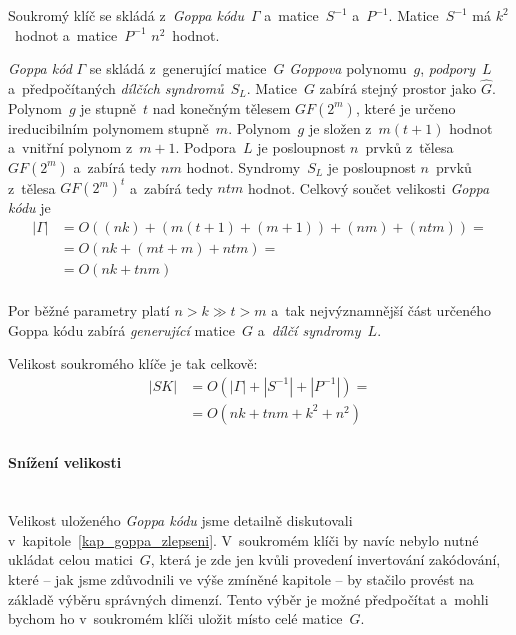 \documentclass[thesis=M,czech,hidelinks]{FITthesis}[2012/06/26]
\newcommand{\0}{{\textcolor[gray]{0.75}{0}}}
\begin{document}
Soukromý klíč se skládá z~\emph{Goppa kódu}~$\Gamma$ a~matice~$S^{-1}$
a~$P^{-1}$. Matice~$S^{-1}$ má $k^2$~hodnot a~matice~$P^{-1}$ $n^2$~hodnot.

\emph{Goppa kód} $\Gamma$ se skládá z~generující matice~$G$ \emph{Goppova}
polynomu~$g$, \emph{podpory}~$L$ a~předpočítaných \emph{dílčích syndromů}~$S_L$.
Matice~$G$ zabírá stejný prostor jako $\hat{G}$. Polynom~$g$ je stupně~$t$ nad
konečným tělesem $GF(2^m)$, které je určeno ireducibilním polynomem stupně~$m$.
Polynom~$g$ je složen z~$m(t+1)$ hodnot a~vnitřní polynom z~$m+1$. Podpora~$L$
je posloupnost $n$~prvků z~tělesa $GF(2^m)$ a~zabírá tedy $n m$ hodnot.
Syndromy~$S_L$ je posloupnost $n$~prvků z~tělesa $GF(2^m)^t$ a~zabírá tedy
$n t m$ hodnot. Celkový součet velikosti \emph{Goppa kódu} je
\begin{align*}
    \left|\Gamma\right| &= O\left( (nk) + ( m(t+1) + (m+1) ) + (nm) + (ntm) \right) = \\
                        &= O\left(  nk + ( mt + m ) + ntm  \right) = \\
                        &= O\left(  nk + tnm \right) \\
\end{align*}

Por běžné parametry platí $n > k \gg t > m$ a~tak nejvýznamnější část určeného
Goppa kódu zabírá \emph{generující} matice~$G$ a~\emph{dílčí syndromy}~$L$.

Velikost soukromého klíče je tak celkově:
\begin{align*}
    \left|SK\right| &= O(\left|\Gamma\right| + \left|S^{-1}\right| + \left|P^{-1}\right| ) = \\
                    &= O( nk + tnm + k^2 + n^2 ) \\
\end{align*}



\paragraph{Snížení velikosti} \hfil \\
Velikost uloženého \emph{Goppa kódu} jsme detailně diskutovali
v~kapitole~\ref{kap_goppa_zlepseni}. V~soukromém klíči by navíc nebylo nutné
ukládat celou matici~$G$, která je zde jen kvůli provedení invertování
zakódování, které -- jak jsme zdůvodnili ve výše zmíněné kapitole -- by stačilo
provést na základě výběru správných dimenzí. Tento výběr je možné předpočítat
a~mohli bychom ho v~soukromém klíči uložit místo celé matice~$G$.
\end{document}
